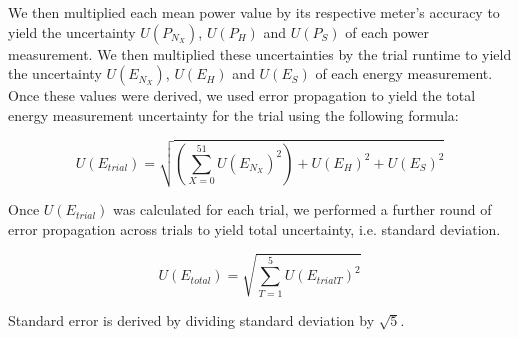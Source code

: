 We then multiplied each mean power value by its respective meter's accuracy to
yield the uncertainty $U(P_{N_X})$, $U(P_{H})$ and $U(P_{S})$ of each power
measurement. We then multiplied these uncertainties by the trial runtime to
yield the uncertainty $U(E_{N_X})$, $U(E_{H})$ and $U(E_{S})$ of each energy
measurement. Once these values were derived, we used error propagation to yield
the total energy measurement uncertainty for the trial using the following
formula:

\[U(E_{trial}) = \sqrt{(\sum_{X=0}^{51}{U(E_{N_X})^2}) + U(E_H)^2 + U(E_S)^2}\]

Once $U(E_{trial})$ was calculated for each trial, we performed a further round
of error propagation across trials to yield total uncertainty, i.e. standard
deviation.

\[U(E_{total}) = \sqrt{\sum_{T=1}^{5}{U(E_{trial T})^2}}\]

Standard error is derived by dividing standard deviation by $\sqrt{5}$.
